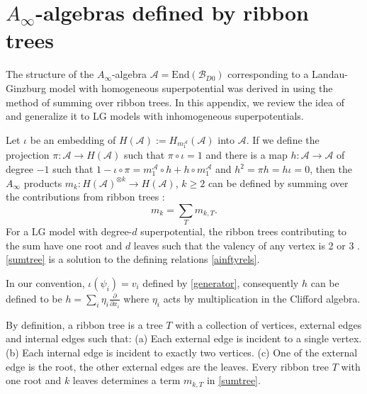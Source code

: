 \documentclass[a4paper,11pt]{article}
\def\cA{\mathcal{A}}
\newcommand{\Af}{{A_\infty}}
\numberwithin{equation}{section}
\begin{document}
\section{$\Af$-algebras defined by ribbon trees}\label{app:ribbon}

The structure of the $\Af$-algebra $\cA=\mathrm{End}(\mathcal{B}_{D0})$ 
corresponding to a Landau-Ginzburg model with 
homogeneous superpotential was derived in \cite{ballard2014derived} using the 
method of summing over ribbon trees. In this appendix, we review the idea of 
\cite{ballard2014derived} and generalize it to LG models with inhomogeneous 
superpotentials.

Let $\iota$ be an embedding of $H(\cA):=H_{m^{\mathcal{A}}_{1}}(\cA)$ into 
$\cA$. If we define the 
projection $\pi: \cA \rightarrow H(\cA)$ such that $\pi \circ \iota = 1$ and 
there is a map $h: \cA \rightarrow \cA$ of degree $-1$ such that $1 - \iota 
\circ \pi = m^{\mathcal{A}}_{1}\circ h+ h \circ m^{\mathcal{A}}_{1}$ and $h^2 = 
\pi h = h \iota = 0$, then the 
$\Af$ products $m_{k}:H(\cA)^{\otimes k}\rightarrow H(\cA)$, $k\geq 2$ can be 
defined by summing over the contributions from 
ribbon trees \cite{Kontsevich:2000yf}:
\begin{equation}\label{sumtree}
m_k = \sum_T m_{k,T}.
\end{equation}
For a LG model with degree-$d$ superpotential, the ribbon trees contributing to 
the sum have one root and $d$ leaves such that the valency of any vertex is 2 or 
3  \cite{ballard2014derived}. \eqref{sumtree} is a solution to the defining 
relations \eqref{ainftyrels}.

In our convention, $\iota(\psi_i) = v_i$ defined by \eqref{generator}, 
consequently $h$ can be defined to be $h = \sum_i \eta_i 
\frac{\partial}{\partial x_i}$ where $\eta_i$ acts by multiplication in the Clifford algebra.

By definition, a ribbon tree is a tree $T$ with a collection of vertices, external edges and internal edges such that: (a) Each external edge is incident to a single vertex. (b) Each internal edge is incident to exactly two vertices. (c) One of the external edge is the root, the other external edges are the leaves. Every ribbon tree $T$ with one root and $k$ leaves determines a term $m_{k,T}$ in \eqref{sumtree}.
\end{document}
